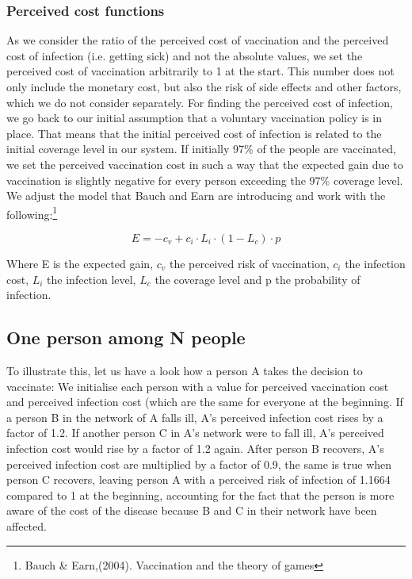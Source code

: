 \documentclass[11pt]{article}
\begin{document}
\subsubsection{Perceived cost functions} 
As we consider the ratio of the perceived cost of vaccination and the perceived cost of infection (i.e. getting sick) and not the absolute values, we set the perceived cost of vaccination arbitrarily to 1 at the start. This number does not only include the monetary cost, but also the risk of side effects and other factors, which we do not consider separately. For finding the perceived cost of infection, we go back to our initial assumption that a voluntary vaccination policy is in place. That means that the initial perceived cost of infection is related to the initial coverage level in our system. If initially 97\% of the people are vaccinated, we set the perceived vaccination cost in such a way that the expected gain due to vaccination is slightly negative for every person exceeding the 97\% coverage level. We adjust the model that Bauch and Earn are introducing and work with the following:\footnote{Bauch \& Earn,(2004). Vaccination and the theory of games} 

\begin{equation}
E = -c_v + c_i \cdot L_i\cdot(1-L_c)\cdot p
\end{equation}

Where E is the expected gain, $c_v$ the perceived risk of vaccination, $c_i$ the infection cost, $L_i$ the infection level, $L_c$ the coverage level and p the probability of infection. 
\vspace{14px}
 

\subsection{One person among N people}
To illustrate this, let us have a look how a person A takes the decision to vaccinate: 
We initialise each person with a value for perceived vaccination cost and perceived infection cost (which are the same for everyone at the beginning. 
If a person B in the network of A falls ill, A's perceived infection cost rises by a factor of 1.2. If another person C in A's network were to fall ill, A's perceived infection cost would rise by a factor of 1.2 again. After person B recovers, A's perceived infection cost are multiplied by a factor of 0.9, the same is true when person C recovers, leaving person A with a perceived risk of infection of 1.1664 compared to 1 at the beginning, accounting for the fact that the person is more aware of the cost of the disease because B and C in their network have been affected. 
\end{document}
